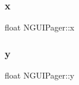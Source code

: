 \subsubsection{\texorpdfstring{x}{x}}
{\footnotesize\ttfamily float N\+G\+U\+I\+Pager\+::x}

\hypertarget{class_n_g_u_i_pager_ab953951f509df65d1c7fea8716281f06}{}\label{class_n_g_u_i_pager_ab953951f509df65d1c7fea8716281f06} 
\subsubsection{\texorpdfstring{y}{y}}
{\footnotesize\ttfamily float N\+G\+U\+I\+Pager\+::y}

